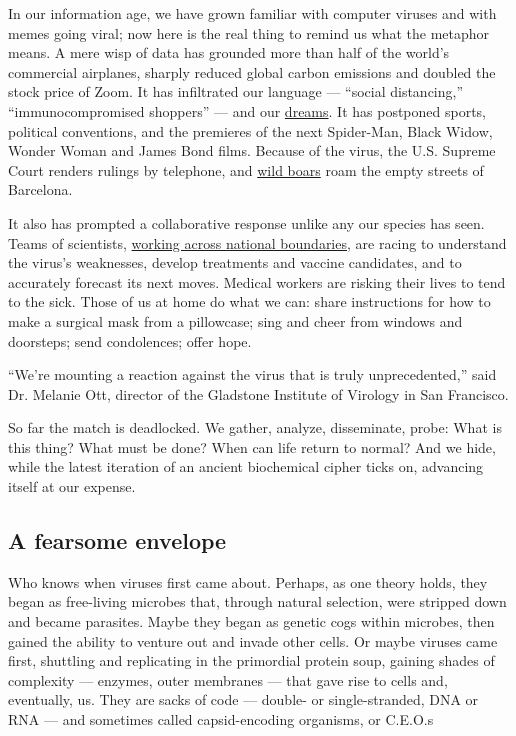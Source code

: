 In our information age, we have grown familiar with computer viruses and
with memes going viral; now here is the real thing to remind us what the
metaphor means. A mere wisp of data has grounded more than half of the
world's commercial airplanes, sharply reduced global carbon emissions
and doubled the stock price of Zoom. It has infiltrated our language ---
``social distancing,'' ``immunocompromised shoppers'' --- and our
\href{https://www.nytimes3xbfgragh.onion/2020/04/13/style/why-weird-dreams-coronavirus.html}{dreams}.
It has postponed sports, political conventions, and the premieres of the
next Spider-Man, Black Widow, Wonder Woman and James Bond films. Because
of the virus, the U.S. Supreme Court renders rulings by telephone, and
\href{https://www.nytimes3xbfgragh.onion/2020/04/17/arts/coronavirus-nature-genre.html}{wild
boars} roam the empty streets of Barcelona.

It also has prompted a collaborative response unlike any our species has
seen. Teams of scientists,
\href{https://www.nytimes3xbfgragh.onion/2020/04/01/world/europe/coronavirus-science-research-cooperation.html}{working
across national boundaries}, are racing to understand the virus's
weaknesses, develop treatments and vaccine candidates, and to accurately
forecast its next moves. Medical workers are risking their lives to tend
to the sick. Those of us at home do what we can: share instructions for
how to make a surgical mask from a pillowcase; sing and cheer from
windows and doorsteps; send condolences; offer hope.

``We're mounting a reaction against the virus that is truly
unprecedented,'' said Dr. Melanie Ott, director of the Gladstone
Institute of Virology in San Francisco.

So far the match is deadlocked. We gather, analyze, disseminate, probe:
What is this thing? What must be done? When can life return to normal?
And we hide, while the latest iteration of an ancient biochemical cipher
ticks on, advancing itself at our expense.

\hypertarget{a-fearsome-envelope}{%
\subsection{A fearsome envelope}\label{a-fearsome-envelope}}

Who knows when viruses first came about. Perhaps, as one theory holds,
they began as free-living microbes that, through natural selection, were
stripped down and became parasites. Maybe they began as genetic cogs
within microbes, then gained the ability to venture out and invade other
cells. Or maybe viruses came first, shuttling and replicating in the
primordial protein soup, gaining shades of complexity --- enzymes, outer
membranes --- that gave rise to cells and, eventually, us. They are
sacks of code --- double- or single-stranded, DNA or RNA --- and
sometimes called capsid-encoding organisms, or C.E.O.s

